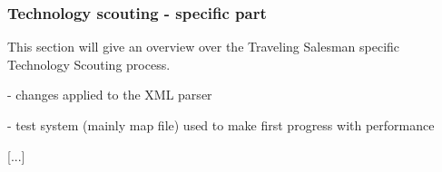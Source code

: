\subsubsection{Technology scouting - specific part}
\label{sec:techscout_routing_specific}

This section will give an overview over the Traveling Salesman specific Technology Scouting process.\newline

- changes applied to the XML parser

- test system (mainly map file) used to make first progress with performance

[...]


